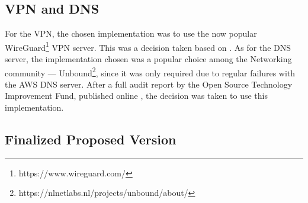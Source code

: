 \subsection{VPN and DNS}\label{methodology:ss:vpn-and-dns}

For the VPN, the chosen implementation was to use the now popular WireGuard\footnote{https://www.wireguard.com/\label{foot:wireguard}} VPN server. This was a decision taken based on \parencite{ndss_wireguard}.
As for the DNS server, the implementation chosen was a popular choice among the Networking community --- Unbound\footnote{https://nlnetlabs.nl/projects/unbound/about/}, since it was only required due to regular failures with the AWS DNS server. After a full audit report by the Open Source Technology Improvement Fund, published online \parencite{ostif_2022}, the decision was taken to use this implementation.


\subsection{Finalized Proposed Version}\label{methodology:ss:finalized-proposed-version}